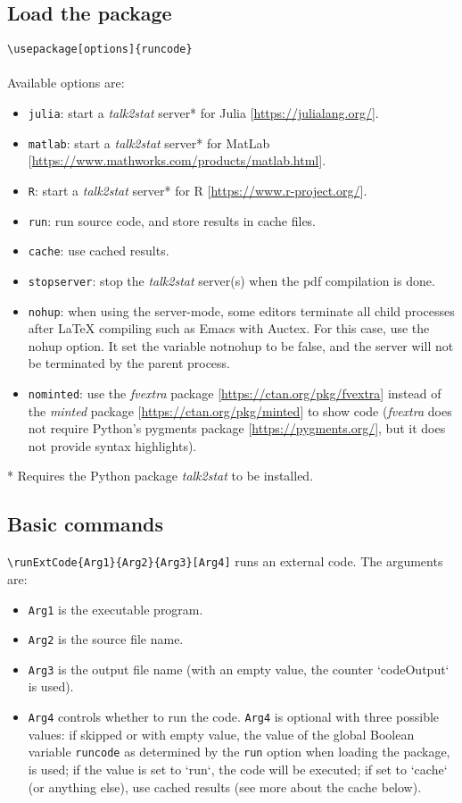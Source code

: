 \documentclass{ltxdoc}
\begin{document}
\subsection{Load the package}
\verb|\usepackage[options]{runcode}|\\
\\
Available options are: 
\begin{itemize}
\item  \texttt{julia}: start a \textit{talk2stat} server* for Julia [\url{https://julialang.org/}].
\item  \texttt{matlab}: start a \textit{talk2stat} server* for MatLab [\url{https://www.mathworks.com/products/matlab.html}].
\item  \texttt{R}: start a \textit{talk2stat} server* for R [\url{https://www.r-project.org/}].
\item  \texttt{run}: run source code, and store results in cache files.
\item  \texttt{cache}: use cached results.
\item  \texttt{stopserver}: stop the \textit{talk2stat} server(s) when the pdf compilation is done.
\item  \texttt{nohup}:  when using the server-mode, some editors terminate all child processes after LaTeX compiling such as Emacs with Auctex. For this case, use the nohup option. It set the variable notnohup to be false, and the server will not be terminated by the parent process.
\item  \texttt{nominted}: use the \textit{fvextra} package [\url{https://ctan.org/pkg/fvextra}] instead of the \textit{minted}  package [\url{https://ctan.org/pkg/minted}] to show code (\textit{fvextra} does not require Python's pygments package [\url{https://pygments.org/}], but it does not provide syntax highlights).
\end{itemize}
* Requires the Python package \textit{talk2stat} to be installed.

\subsection{Basic commands}
\verb|\runExtCode{Arg1}{Arg2}{Arg3}[Arg4]| runs an external code. The arguments are:
\begin{itemize}
\item \texttt{Arg1} is the executable program.
\item \texttt{Arg2} is the source file name.
\item \texttt{Arg3} is the output file name (with an empty value, the counter  `codeOutput` is used).
\item \texttt{Arg4} controls whether to run the code. \texttt{Arg4} is optional with three possible values: if skipped or with empty value, the value of the global Boolean variable \texttt{runcode} as determined by the \texttt{run} option when loading the package, is used; if the value is set to `run`, the code will be executed; if set to `cache` (or anything else), use cached results (see more about the cache below).
\end{itemize}
\end{document}
